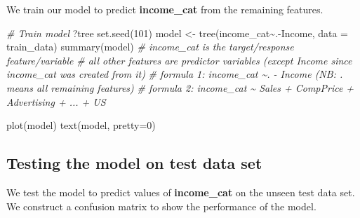 \documentclass[
]{article}
\newenvironment{Shaded}{\begin{snugshade}}{\end{snugshade}}
\newcommand{\AttributeTok}[1]{\textcolor[rgb]{0.77,0.63,0.00}{#1}}
\newcommand{\CommentTok}[1]{\textcolor[rgb]{0.56,0.35,0.01}{\textit{#1}}}
\newcommand{\DecValTok}[1]{\textcolor[rgb]{0.00,0.00,0.81}{#1}}
\newcommand{\FunctionTok}[1]{\textcolor[rgb]{0.00,0.00,0.00}{#1}}
\newcommand{\NormalTok}[1]{#1}
\newcommand{\OtherTok}[1]{\textcolor[rgb]{0.56,0.35,0.01}{#1}}
\newcommand{\SpecialCharTok}[1]{\textcolor[rgb]{0.00,0.00,0.00}{#1}}
\newcommand{\StringTok}[1]{\textcolor[rgb]{0.31,0.60,0.02}{#1}}
\begin{document}
We train our model to predict \textbf{income\_cat} from the remaining
features.

\begin{Shaded}
\begin{Highlighting}[]
\CommentTok{\# Train model}
\NormalTok{?tree}
\FunctionTok{set.seed}\NormalTok{(}\DecValTok{101}\NormalTok{)}
\NormalTok{model }\OtherTok{\textless{}{-}} \FunctionTok{tree}\NormalTok{(income\_cat}\SpecialCharTok{\textasciitilde{}}\NormalTok{.}\SpecialCharTok{{-}}\NormalTok{Income, }\AttributeTok{data =}\NormalTok{ train\_data)}
\FunctionTok{summary}\NormalTok{(model)}
\CommentTok{\# income\_cat is the target/response feature/variable}
\CommentTok{\# all other features are predictor variables (except Income since income\_cat was created from it)}
\CommentTok{\# formula 1: income\_cat \textasciitilde{}. {-} Income (NB: . means all remaining features)}
\CommentTok{\# formula 2: income\_cat \textasciitilde{} Sales + CompPrice + Advertising + ... + US}
\end{Highlighting}
\end{Shaded}

\begin{Shaded}
\begin{Highlighting}[]
\FunctionTok{plot}\NormalTok{(model)}
\FunctionTok{text}\NormalTok{(model, }\AttributeTok{pretty=}\DecValTok{0}\NormalTok{)}
\end{Highlighting}
\end{Shaded}

\hypertarget{testing-the-model-on-test-data-set}{%
\subsection{Testing the model on test data
set}\label{testing-the-model-on-test-data-set}}

We test the model to predict values of \textbf{income\_cat} on the
unseen test data set. We construct a confusion matrix to show the
performance of the model.

\begin{Shaded}
\end{Shaded}
\end{document}
